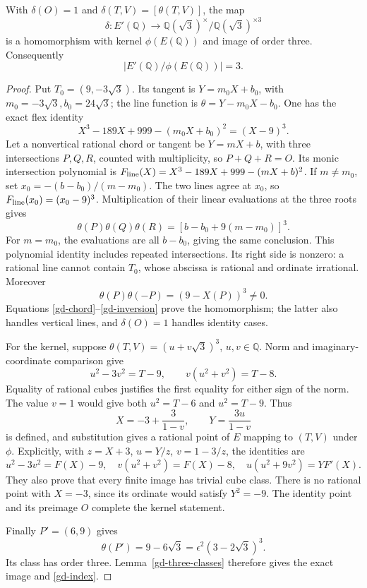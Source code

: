 \begin{theorem}\label{gd-quotient}
With \(\delta(O)=1\) and \(\delta(T,V)=[\theta(T,V)]\), the map
\[
 \delta:E'(\mathbb Q)\longrightarrow
 \mathbb Q(\sqrt3)^\times/\mathbb Q(\sqrt3)^{\times3}
\]
is a homomorphism with kernel \(\phi(E(\mathbb Q))\) and image of
order three. Consequently
\begin{equation}\label{gd-index}
 |E'(\mathbb Q)/\phi(E(\mathbb Q))|=3.
\end{equation}
\end{theorem}
\begin{proof}
Put \(T_0=(9,-3\sqrt3)\). Its tangent is
\(Y=m_0X+b_0\), with \(m_0=-3\sqrt3,b_0=24\sqrt3\);
the line function is \(\theta=Y-m_0X-b_0\).
One has the exact flex identity
\[
 X^3-189X+999-(m_0X+b_0)^2=(X-9)^3.
\]
Let a nonvertical rational chord or tangent be \(Y=mX+b\), with
three intersections \(P,Q,R\), counted with multiplicity, so
\(P+Q+R=O\). Its monic intersection polynomial is
\(F_{\rm line}(X)=X^3-189X+999-(mX+b)^2\).
If \(m\ne m_0\), set \(x_0=-(b-b_0)/(m-m_0)\).
The two lines agree at \(x_0\), so \(F_{\rm line}(x_0)=(x_0-9)^3\).
Multiplication of their linear evaluations at the three roots gives
\begin{equation}\label{gd-chord}
 \theta(P)\theta(Q)\theta(R)
   =[b-b_0+9(m-m_0)]^3.
\end{equation}
For \(m=m_0\), the evaluations are all \(b-b_0\), giving the same
conclusion. This polynomial identity includes repeated intersections.
Its right side is nonzero: a rational line cannot contain \(T_0\),
whose abscissa is rational and ordinate irrational.
Moreover
\begin{equation}\label{gd-inversion}
 \theta(P)\theta(-P)=(9-X(P))^3\ne0.
\end{equation}
Equations \eqref{gd-chord}--\eqref{gd-inversion} prove the
homomorphism; the latter also handles vertical lines, and
\(\delta(O)=1\) handles identity cases.

For the kernel, suppose
\(\theta(T,V)=(u+v\sqrt3)^3\), \(u,v\in\mathbb Q\).
Norm and imaginary-coordinate comparison give
\[
 u^2-3v^2=T-9,\qquad v(u^2+v^2)=T-8.
\]
Equality of rational cubes justifies the first equality for either
sign of the norm. The value \(v=1\) would give both
\(u^2=T-6\) and \(u^2=T-9\). Thus
\begin{equation}\label{gd-phi-inverse}
 X=-3+\frac3{1-v},\qquad Y=\frac{3u}{1-v}
\end{equation}
is defined, and substitution gives a rational point of \(E\)
mapping to \((T,V)\) under \(\phi\).
Explicitly, with \(z=X+3\), \(u=Y/z\), \(v=1-3/z\), the
identities are
\[
 u^2-3v^2=F(X)-9,\quad
 v(u^2+v^2)=F(X)-8,\quad
 u(u^2+9v^2)=YF'(X).
\]
They also prove that every finite image has trivial cube class.
There is no rational point with \(X=-3\), since its ordinate would
satisfy \(Y^2=-9\). The identity point and its preimage \(O\)
complete the kernel statement.

Finally \(P'=(6,9)\) gives
\[
 \theta(P')=9-6\sqrt3=\epsilon^2(3-2\sqrt3)^3.
\]
Its class has order three. Lemma~\ref{gd-three-classes} therefore
gives the exact image and \eqref{gd-index}.
\end{proof}

